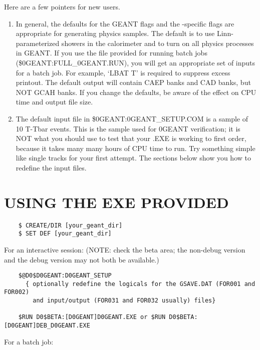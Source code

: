 Here are a few pointers for new users.

\begin{enumerate}

\item In general, the defaults for the GEANT flags and the -specific flags
are appropriate for generating physics samples.  The default is to use
Linn-parameterized showers in the calorimeter and to turn on all physics
processes in GEANT.  If you use the file provided for running batch jobs
(\$\D0GEANT:FULL\_\D0GEANT.RUN), you will get an appropriate set of
inputs for a batch job. For example, `LBAT T' is required to suppress excess
printout. The default output will contain CAEP banks and CAD banks, but NOT GCAH
banks. If you change the defaults, be aware of the effect on CPU time and output
file size.

\item The default input file in \$\D0GEANT:\D0GEANT\_SETUP.COM is a sample of
10 T-Tbar events.  This is the sample used for \D0GEANT verification; it is NOT
what you should use to test that your .EXE is working to first order, because it
takes many many hours of CPU time to run.  Try something simple like single
tracks for your first attempt.  The sections below show you how to redefine the
input files.

\end{enumerate}

\section{USING THE EXE PROVIDED}
\label{provide}

\begin{verbatim}
    $ CREATE/DIR [your_geant_dir]
    $ SET DEF [your_geant_dir]
\end{verbatim}

For an interactive session: (NOTE: check the beta area; the non-debug version
and the debug version may not both be available.)

\begin{verbatim}
    $@D0$D0GEANT:D0GEANT_SETUP
      { optionally redefine the logicals for the GSAVE.DAT (FOR001 and FOR002)
        and input/output (FOR031 and FOR032 usually) files}

    $RUN D0$BETA:[D0GEANT]D0GEANT.EXE or $RUN D0$BETA:[D0GEANT]DEB_D0GEANT.EXE
\end{verbatim}

For a batch job:

